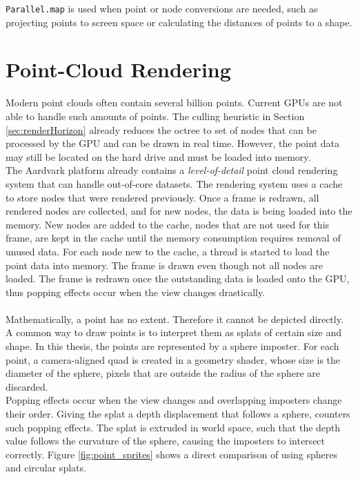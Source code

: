 \verb|Parallel.map| is used when point or node conversions are needed, such as projecting points to screen space or calculating the distances of points to a shape. 


\section{Point-Cloud Rendering}
\label{sec:rendering}

Modern point clouds often contain several billion points. Current GPUs are not able to handle such amounts of points. The culling heuristic in Section \ref{sec:renderHorizon} already reduces the octree to set of nodes that can be processed by the GPU and can be drawn in real time. However, the point data may still be located on the hard drive and must be loaded into memory. 
\\
The Aardvark platform already contains a \textit{level-of-detail} point cloud rendering system that can handle out-of-core datasets. The rendering system uses a cache to store nodes that were rendered previously. Once a frame is redrawn, all rendered nodes are collected, and for new nodes, the data is being loaded into the memory. New nodes are added to the cache, nodes that are not used for this frame, are kept in the cache until the memory consumption requires removal of unused data. For each node new to the cache, a thread is started to load the point data into memory. The frame is drawn even though not all nodes are loaded. The frame is redrawn once the outstanding data is loaded onto the GPU, thus popping effects occur when the view changes drastically. 
\\
\\
Mathematically, a point has no extent. Therefore it cannot be depicted directly. A common way to draw points is to interpret them as splats of certain size and shape. In this thesis, the points are represented by a sphere imposter. For each point, a camera-aligned quad is created in a geometry shader, whose size is the diameter of the sphere, pixels that are outside the radius of the sphere are discarded. 
\\
Popping effects occur when the view changes and overlapping imposters change their order. Giving the splat a depth displacement that follows a sphere, counters such popping effects. The splat is extruded in world space, such that the depth value follows the curvature of the sphere, causing the imposters to intersect correctly. Figure \ref{fig:point_sprites} shows a direct comparison of using spheres and circular splats. 


